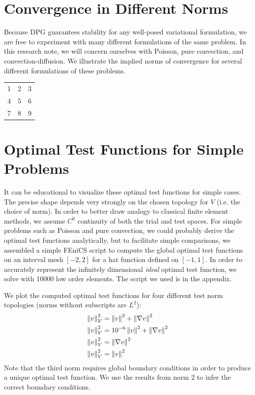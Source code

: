 \documentclass{article}
\begin{document}
\section*{Convergence in Different Norms}
Because DPG guarantees stability for any well-posed variational formulation, we are free to experiment with many different formulations of the same problem.
In this research note, we will concern ourselves with Poisson, pure convection, and convection-diffusion.
We illustrate the implied norms of convergence for several different formulations of these problems.

\begin{table}
\centering
\begin{tabular}{ c c c }
  1 & 2 & 3 \\
  4 & 5 & 6 \\
  7 & 8 & 9 \\
\end{tabular}
\end{table}

\section*{Optimal Test Functions for Simple Problems}
It can be educational to visualize these optimal test functions for simple cases.
The precise shape depends very strongly on the chosen topology for $V$ (i.e. the choice of norm).
In order to better draw analogy to classical finite element methods, we assume $C^0$ continuity of both the trial and test spaces.
For simple problems such as Poisson and pure convection, we could probably derive the optimal test functions analytically, 
but to facilitate simple comparisons, we assembled a simple FEniCS script to compute the global optimal test functions on an interval mesh $[-2,2]$ 
for a hat function defined on $[-1,1]$. In order to accurately represent the infinitely dimensional \emph{ideal} optimal test function, 
we solve with 10000 low order elements. The script we used is in the appendix.

We plot the computed optimal test functions for four different test norm topologies (norms without subscripts are $L^2$):
\begin{align*}
\left\| v \right\|^2_V&=\left\| v \right\|^2+\left\| \nabla v \right\|^2\\
\left\| v \right\|^2_V&=10^{-6}\left\| v \right\|^2+\left\| \nabla v \right\|^2\\
\left\| v \right\|^2_V&=\left\| \nabla v \right\|^2\\
\left\| v \right\|^2_V&=\left\| v \right\|^2
\end{align*}
Note that the third norm requires global boundary conditions in order to produce a unique optimal test function. 
We use the results from norm 2 to infer the correct boundary conditions.
\end{document}
